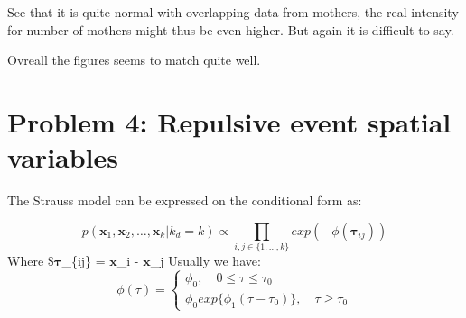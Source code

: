 \documentclass[
]{article}
\newenvironment{Shaded}{\begin{snugshade}}{\end{snugshade}}
\newcommand{\DataTypeTok}[1]{\textcolor[rgb]{0.13,0.29,0.53}{#1}}
\newcommand{\DecValTok}[1]{\textcolor[rgb]{0.00,0.00,0.81}{#1}}
\newcommand{\KeywordTok}[1]{\textcolor[rgb]{0.13,0.29,0.53}{\textbf{#1}}}
\newcommand{\NormalTok}[1]{#1}
\newcommand{\OperatorTok}[1]{\textcolor[rgb]{0.81,0.36,0.00}{\textbf{#1}}}
\newcommand{\StringTok}[1]{\textcolor[rgb]{0.31,0.60,0.02}{#1}}
\newcommand{\vect}[1]{\ensuremath{\boldsymbol{\mathbf{#1}}}}
\begin{document}
\begin{Shaded}
\end{Shaded}

See that it is quite normal with overlapping data from mothers, the real
intensity for number of mothers might thus be even higher. But again it
is difficult to say.

Ovreall the figures seems to match quite well.

\hypertarget{problem-4-repulsive-event-spatial-variables}{%
\section{Problem 4: Repulsive event spatial
variables}\label{problem-4-repulsive-event-spatial-variables}}

The Strauss model can be expressed on the conditional form as:

\begin{equation}
p(\vect x_1, \vect x_2, \dots , \vect x_k | k_d = k) \propto \prod_{i,j \in \lbrace 1, \dots, k\rbrace} exp(-\phi(\vect \tau_{ij})) 
\end{equation} Where \$\vect \tau\_\{ij\} = \textbar{} \vect x\_i -
\vect x\_j \textbar{} Usually we have: \begin{equation}
  \phi(\tau) = \left\{
                \begin{array}{ll}
                  \phi_0, \quad 0 \leq \tau \leq \tau_0 \\
                  \phi_0 exp\lbrace \phi_1(\tau - \tau_0)\rbrace, \quad \tau \geq \tau_0
                \end{array}
              \right.
\end{equation}
\end{document}
